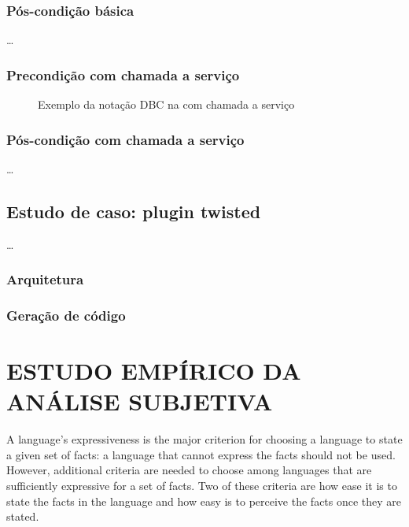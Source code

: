 \subsubsection{Pós-condição básica}

\ldots



\subsubsection{Precondição com chamada a serviço}

\begin{figure}[htb]
\begin{small}

\end{small}
\caption{Exemplo da notação DBC na \neoidl{} com chamada a serviço}
\label{lst:DBCService}
\end{figure} 


\subsubsection{Pós-condição com chamada a serviço}

\ldots

\subsection{Estudo de caso: plugin twisted}
\label{pluginTwisted}

\ldots

\subsubsection{Arquitetura}



\subsubsection{Geração de código}

\section{ESTUDO EMPÍRICO DA ANÁLISE SUBJETIVA}
\vspace{-6mm}

\label{analiseSubjetiva}
\vspace{-6mm}

A language's expressiveness is the major criterion for choosing a language to
state a given set of facts: a language that cannot express the facts should not
be used. However, additional criteria are needed to choose among languages that
are sufficiently expressive  for a set of facts. Two of these criteria are how
ease it is to state the facts in the language and how easy is to perceive the
facts once they are stated.

